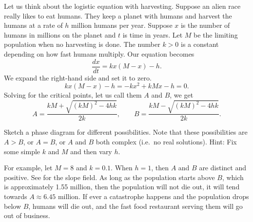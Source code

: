 Let us think about the logistic equation
with harvesting.
Suppose an alien race really likes to
eat humans.  They keep a planet with humans and harvest the
humans at a rate of $h$ million humans per
year.  Suppose $x$
is the number of humans in millions on the planet and $t$ is time in years.
Let $M$ be the limiting
population when no harvesting is done.  The number $k > 0$ is a
constant depending
on how fast humans multiply.  Our equation becomes
\begin{equation*}
\frac{dx}{dt} = kx(M-x) - h .
\end{equation*}
We expand the right-hand side and set it to zero.
\begin{equation*}
kx(M-x) - h = -kx^2+kMx - h  = 0.
\end{equation*}
Solving for
the critical points,
let us call them $A$ and $B$, we get
\begin{equation*}
A = \frac{kM + \sqrt{{(kM)}^2 - 4hk}}{2k}, \qquad
B = \frac{kM - \sqrt{{(kM)}^2 - 4hk}}{2k} .
\end{equation*}

\begin{exercise}
Sketch a phase diagram for different possibilities.  Note
that these possibilities are $A > B$, or $A=B$, or $A$ and $B$ both complex
(i.e.\ no real solutions).  Hint: Fix some simple $k$ and $M$ and then vary
$h$.
\end{exercise}

For example, let $M=8$ and $k=0.1$.
When $h=1$, then $A$ and $B$ are distinct and positive.
See  for the slope field.  As long as
the population starts above $B$, which is approximately 1.55 million, then
the population will not die out, it will tend towards $A \approx
6.45$ million.  If ever a catastrophe happens and
the population drops below $B$,
humans will die out, and the fast food restaurant serving them will go out
of business.

